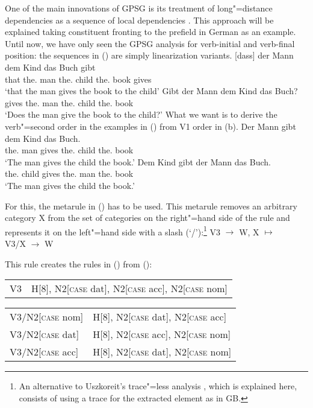 One of the main innovations of GPSG is its treatment of long"=distance dependencies as a sequence of local dependencies \citep{Gazdar81a}.
This approach will be explained taking constituent fronting to the prefield in German as an
example. Until now, we have only seen the GPSG analysis for verb-initial and verb-final position: the
sequences in () are simply linearization variants.
\eal
\ex 
\ex 
\gll {}[dass] der Mann dem Kind das Buch gibt\\
	 {}\spacebr{}that the.\NOM{} man the.\DAT{} child the.\ACC{} book gives\\
\glt `that the man gives the book to the child'
\ex 
\gll Gibt der Mann dem Kind das Buch?\\
	 gives the.\NOM{} man the.\DAT{} child the.\ACC{} book\\
\glt `Does the man give the book to the child?'
\zl
What we want is to derive the verb"=second order in the examples in () from V1 order in (b).
\eal
\ex 
\gll Der Mann gibt dem Kind das Buch.\\
     the.\NOM{} man  gives the.\DAT{} child the.\ACC{} book\\
\glt `The man gives the child the book.'
\ex 
\gll Dem Kind gibt der Mann das Buch.\\
     the.\DAT{} child gives the.\NOM{} man the.\ACC{} book\\
\glt `The man gives the child the book.'
\zl

\noindent
For this, the metarule in () has to be used. This metarule removes an arbitrary category X from the set of categories on the right"=hand side of the rule and represents it on
the left"=hand side with a slash (`/')\is{/}:\footnote{%
	An alternative to Uszkoreit's trace"=less analysis \citeyearpar[]{Uszkoreit87a},
        which is explained here, consists of using a trace
	for the extracted element as in GB.
}
\ea
\label{meta-slash-intro}
V3  $\to$ W, X $\mapsto$\\
V3/X  $\to$ W
\z

\noindent
This rule creates the rules in () from ():
\ea
\begin{tabular}[t]{@{}l@{~$\to$~}l@{}}
V3  & H[8], N2[\textsc{case} dat], N2[\textsc{case} acc], N2[\textsc{case} nom] 
\end{tabular}
\z
\ea
\begin{tabular}[t]{@{}l@{~$\to$~}l@{}}
V3/N2[\textsc{case} nom] &  H[8], N2[\textsc{case} dat], N2[\textsc{case} acc]\\
V3/N2[\textsc{case} dat] &  H[8], N2[\textsc{case} acc], N2[\textsc{case} nom]\\
V3/N2[\textsc{case} acc] &  H[8], N2[\textsc{case} dat], N2[\textsc{case} nom]\\
\end{tabular}
\z

